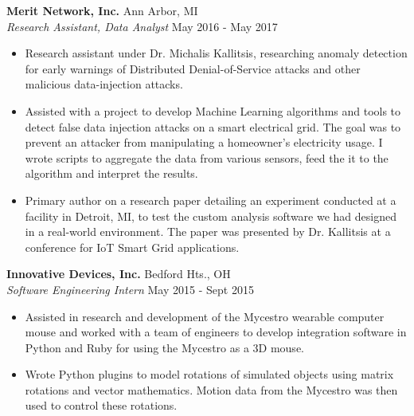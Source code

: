 \documentclass[margin,11pt]{res}
\begin{document}
\begin{resume}
\pagebreak

\vspace{-10pt}
\textbf{Merit Network, Inc.} \hfill Ann Arbor, MI\\
\textsl{Research Assistant, Data Analyst} \hfill May 2016 - May 2017
\begin{itemize}
    \itemsep -2pt
    \item Research assistant under Dr. Michalis Kallitsis, researching anomaly
          detection for early warnings of Distributed Denial-of-Service attacks
          and other malicious data-injection attacks.
    \item Assisted with a project to develop Machine Learning algorithms and
          tools to detect false data injection attacks on a smart electrical
          grid. The goal was to prevent an attacker from manipulating a
          homeowner's electricity usage. I wrote scripts to aggregate the data
          from various sensors, feed the it to the algorithm and interpret the
          results.
    \item Primary author on a research paper detailing an experiment conducted
          at a facility in Detroit, MI, to test the custom analysis software
          we had designed in a real-world environment. The paper was presented
          by Dr. Kallitsis at a conference for IoT Smart Grid applications.
\end{itemize}

\vspace{-10pt}
\textbf{Innovative Devices, Inc.} \hfill Bedford Hts., OH\\
\textsl{Software Engineering Intern} \hfill May 2015 - Sept 2015
\begin{itemize}
    \itemsep -2pt
    \item Assisted in research and development of the Mycestro wearable computer
          mouse and worked with a team of engineers to develop integration
          software in Python and Ruby for using the Mycestro as a 3D mouse.
    \item Wrote Python plugins to model rotations of simulated objects using
          matrix rotations and vector mathematics. Motion data from the Mycestro
          was then used to control these rotations.
\end{itemize}

\vspace{-10pt}

\end{resume}
\end{document}
